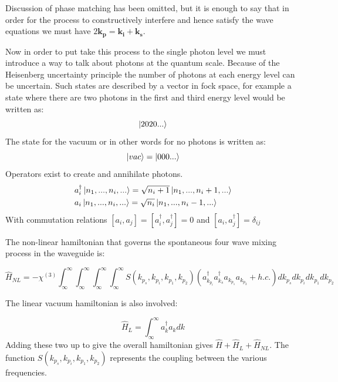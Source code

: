 Discussion of phase matching has been omitted, but it is enough to say that in order for the process to constructively interfere and hence satisfy the wave equations we must have $2\mathbf{k_p}=\mathbf{k_i}+\mathbf{k_s}$.


Now in order to put take this process to the single photon level we must introduce a way to talk about photons at the quantum scale. Because of the Heisenberg uncertainty principle the number of photons at each energy level can be uncertain. Such states are described by a vector in fock space, for example a state where there are two photons in the first and third energy level would be written as:
\begin{equation}
	\ket{2020...}
\end{equation}
The state for the vacuum or in other words for no photons is written as:
\begin{equation}
	\ket{vac}=\ket{000...}
\end{equation}
Operators exist to create and annihilate photons.
\begin{align}
& a_i^{\dagger}\ket{n_1,...,n_i,...}=\sqrt{n_i+1}\ket{n_1,...,n_i+1,...} \\
& a_i\ket{n_1,...,n_i,...}=\sqrt{n_i}\ket{n_1,...,n_i-1,...} \\
\end{align}
With commutation relations $[a_i,a_j]=[a^{\dagger}_i,a^{\dagger}_j]=0$ and $[a_i,a^{\dagger}_j]=\delta_{ij}$

The non-linear hamiltonian that governs the spontaneous four wave mixing process in the waveguide is:

\begin{equation}
\hat H_{NL} = -\chi^{(3)}\int_\infty^\infty\int_\infty^\infty\int_\infty^\infty\int_\infty^\infty S(k_{p_s},k_{p_i},k_{p_1},k_{p_2})( a_{k_{p_i}}^{\dagger}a_{k_{s}}^{\dagger}a_{k_{p_1}}a_{k_{p_2}} + h.c.)dk_{p_s}dk_{p_i}dk_{p_1}dk_{p_2}
\end{equation}

%
\noindent
The linear vacuum hamiltonian is also involved:

\begin{equation}
\hat H_{L} = \int_\infty^\infty a_{k}^{\dagger}a_{k}dk
\end{equation}
\noindent
Adding these two up to give the overall hamiltonian gives $\hat H + \hat H_{L} + \hat H_{NL}$. The function $S(k_{p_s},k_{p_i},k_{p_1},k_{p_2})$ represents the coupling between the various frequencies. 

